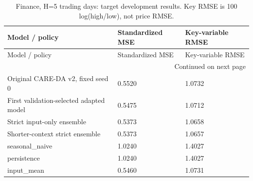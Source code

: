 {\footnotesize
\setlength{\tabcolsep}{3pt}
\renewcommand{\arraystretch}{1.17}
\begin{longtable}{@{}p{}p{}p{}@{}}
\caption{Finance, H=5 trading days: target development results. Key RMSE is 100 log(high/low), not price RMSE.}\label{tab:long_finance}\\
\toprule
Model / policy & Standardized MSE & Key-variable RMSE \\
\midrule\endfirsthead
Model / policy & Standardized MSE & Key-variable RMSE \\
\midrule\endhead
\midrule\multicolumn{3}{r}{Continued on next page}\\\endfoot
\bottomrule\endlastfoot
Original CARE-DA v2, fixed seed 0 & 0.5520 & 1.0732 \\
First validation-selected adapted model & 0.5475 & 1.0712 \\
Strict input-only ensemble & 0.5373 & 1.0658 \\
Shorter-context strict ensemble & 0.5373 & 1.0657 \\
seasonal\_\allowbreak{}naive & 1.0240 & 1.4027 \\
persistence & 1.0240 & 1.4027 \\
input\_\allowbreak{}mean & 0.5460 & 1.0731 \\
\end{longtable}
}
